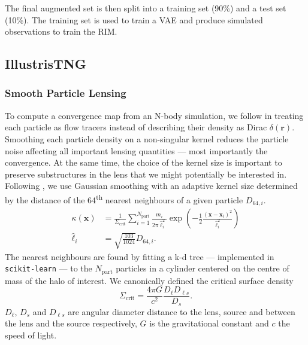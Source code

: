 \documentclass[twocolumn]{aastex631}
\begin{document}
The final augmented set is then split into a training set (90\%) and a test set (10\%). 
The training set is used to train a VAE and produce simulated observations 
to train the RIM.


\subsection{IllustrisTNG}\label{sec:kappa}
\subsubsection{Smooth Particle Lensing}\label{sec:SPL}
To compute a convergence map from an N-body simulation, 
we follow \citet{Auger2007} in treating 
each particle as flow tracers instead of describing their density as Dirac $\delta(\mathbf{r})$. Smoothing 
each particle density on a non-singular kernel reduces the particle noise affecting all 
important lensing quantities --- most importantly the convergence. At the same time, the choice of the kernel size 
is important to preserve substructures in the 
lens that we might potentially be interested in. Following \citet{Rau2013}, we use Gaussian 
smoothing with an adaptive kernel size determined by the distance of the 64\textsuperscript{th} nearest neighbours of 
a given particle $D_{64,i}$. 
\begin{equation}\label{eq:Ksmooth}
\begin{aligned}
    \kappa(\mathbf{x}) &= \frac{1}{\Sigma_{\mathrm{crit}}} \sum_{i=1}^{N_{\mathrm{part}}}
        \frac{m_i}{2 \pi \hat{\ell}^2_i} 
        \exp \left(-\frac{1}{2} \frac{(\mathbf{x} - \mathbf{x}_i)^2}{\hat{\ell}_i^2}  \right) \\
    \hat{\ell}_i &= \sqrt{\frac{103}{1024}}D_{64,i}.
\end{aligned}
\end{equation}
The nearest neighbours are found by fitting a k-d tree ---  implemented in 
\texttt{scikit-learn} \citep{scikit-learn} --- 
to the $N_{\mathrm{part}}$  particles 
in a cylinder centered on the centre of mass of the halo of interest.
We canonically defined the critical surface density
\begin{equation}\label{eq:Scrit}
\Sigma_{\mathrm{crit}} = \frac{4 \pi G}{c^ 2} \frac{D_\ell D_{\ell s}}{D_s}.
\end{equation}
$D_\ell$, $D_s$ and $D_{\ell s}$ are angular diameter distance to the lens, source and between the lens and the source respectively, 
$G$ is the gravitational constant and $c$ the speed of light.
\end{document}
